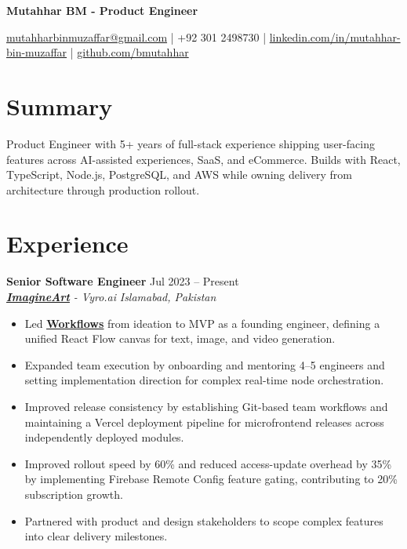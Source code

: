 \documentclass[9pt,letterpaper]{article}
\newcommand{\resumeHeader}[1]{%
  \begin{center}
    \vspace{2pt}
    {\fontsize{18pt}{20pt}\selectfont\bfseries #1\par}
    \vspace{4pt}
  \end{center}
}
\newcommand{\role}[4]{\textbf{#1} \hfill #2 \\
\textit{#3} \hfill \textit{#4}\\[-4pt]}
\begin{document}
\resumeHeader{Mutahhar BM - Product Engineer}
\begin{center}
\fontsize{9pt}{11pt}\selectfont
\href{mailto:mutahharbinmuzaffar@gmail.com}{mutahharbinmuzaffar@gmail.com} \;|\; +92 301 2498730 \;|\;
\href{https://www.linkedin.com/in/mutahhar-bin-muzaffar}{linkedin.com/in/mutahhar-bin-muzaffar} \;|\;
\href{https://github.com/bmutahhar}{github.com/bmutahhar}
\end{center}

\section*{Summary}
Product Engineer with 5+ years of full-stack experience shipping user-facing features across AI-assisted experiences, SaaS, and eCommerce. Builds with React, TypeScript, Node.js, PostgreSQL, and AWS while owning delivery from architecture through production rollout.

\section*{Experience}
\role{Senior Software Engineer}{Jul 2023 -- Present}{\href{https://www.imagine.art/}{\textbf{\underline{ImagineArt}}} - Vyro.ai}{Islamabad, Pakistan}
\begin{itemize}[leftmargin=*, itemsep=0pt, topsep=0pt, partopsep=0pt, parsep=0pt, after=\vspace{2pt}]
  \item Led \href{https://www.imagine.art/flow}{\textbf{\underline{Workflows}}} from ideation to MVP as a founding engineer, defining a unified React Flow canvas for text, image, and video generation.
  \item Expanded team execution by onboarding and mentoring 4--5 engineers and setting implementation direction for complex real-time node orchestration.
  \item Improved release consistency by establishing Git-based team workflows and maintaining a Vercel deployment pipeline for microfrontend releases across independently deployed modules.
  \item Improved rollout speed by 60\% and reduced access-update overhead by 35\% by implementing Firebase Remote Config feature gating, contributing to 20\% subscription growth.
  \item Partnered with product and design stakeholders to scope complex features into clear delivery milestones.

\end{itemize}
\end{document}
